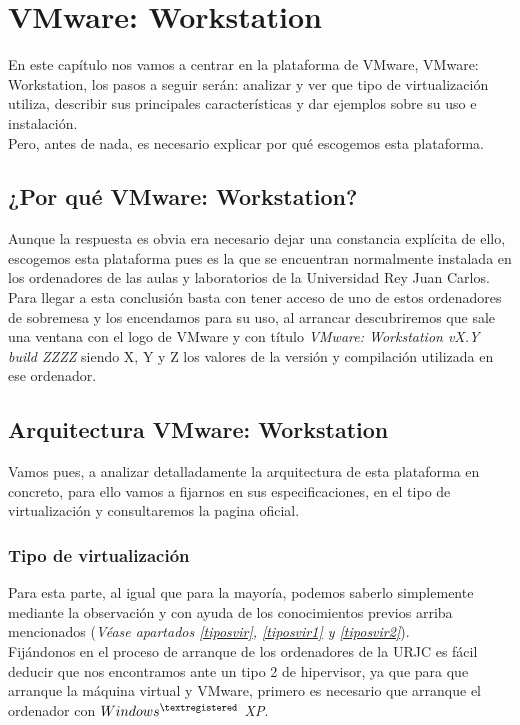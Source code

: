 \chapter{VMware: Workstation}
En este capítulo nos vamos a centrar en la plataforma de VMware, VMware: Workstation\cite{vmwarework}, los pasos a seguir serán: analizar y ver que tipo de virtualización utiliza, describir sus principales características y dar ejemplos sobre su uso e instalación.\\

Pero, antes de nada, es necesario explicar por qué escogemos esta plataforma.

\section{¿Por qué VMware: Workstation?}
Aunque la respuesta es obvia era necesario dejar una constancia explícita de ello, escogemos esta plataforma pues es la que se encuentran normalmente instalada en los ordenadores de las aulas y laboratorios de la Universidad Rey Juan Carlos.\\

Para llegar a esta conclusión basta con tener acceso de uno de estos ordenadores de sobremesa y los encendamos para su uso, al arrancar descubriremos que sale una ventana con el logo de VMware y con título \emph{VMware: Workstation vX.Y build ZZZZ} siendo X, Y y Z los valores de la versión y compilación utilizada en ese ordenador.

\section{Arquitectura VMware: Workstation}
Vamos pues, a analizar detalladamente la arquitectura de esta plataforma en concreto, para ello vamos a fijarnos en sus especificaciones, en el tipo de virtualización y consultaremos la pagina oficial\cite{vmwarework}\cite{vmwareworkhelp}.

\subsection{Tipo de virtualización}
Para esta parte, al igual que para la mayoría, podemos saberlo simplemente mediante la observación y con ayuda de los conocimientos previos arriba mencionados (\textit{Véase apartados \ref{tiposvir}, \ref{tiposvir1} y \ref{tiposvir2}}).\\

Fijándonos en el proceso de arranque de los ordenadores de la URJC es fácil deducir que nos encontramos ante un tipo 2 de hipervisor, ya que para que arranque la máquina virtual y VMware, primero es necesario que arranque el ordenador con \emph{$Windows^{\textregistered}$ XP}.\\

